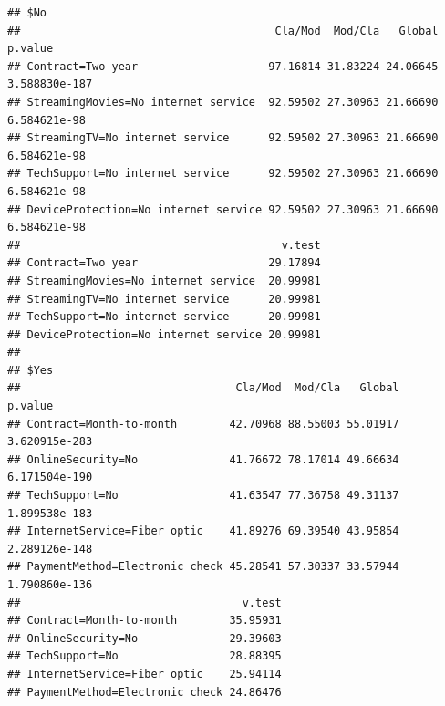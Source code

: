 \documentclass[
  twoside]{article}
\newenvironment{Shaded}{\begin{snugshade}}{\end{snugshade}}
\newcommand{\AttributeTok}[1]{\textcolor[rgb]{0.77,0.63,0.00}{#1}}
\newcommand{\DecValTok}[1]{\textcolor[rgb]{0.00,0.00,0.81}{#1}}
\newcommand{\FunctionTok}[1]{\textcolor[rgb]{0.00,0.00,0.00}{#1}}
\newcommand{\NormalTok}[1]{#1}
\newcommand{\SpecialCharTok}[1]{\textcolor[rgb]{0.00,0.00,0.00}{#1}}
\begin{document}
\begin{verbatim}
## $No
##                                       Cla/Mod  Mod/Cla   Global       p.value
## Contract=Two year                    97.16814 31.83224 24.06645 3.588830e-187
## StreamingMovies=No internet service  92.59502 27.30963 21.66690  6.584621e-98
## StreamingTV=No internet service      92.59502 27.30963 21.66690  6.584621e-98
## TechSupport=No internet service      92.59502 27.30963 21.66690  6.584621e-98
## DeviceProtection=No internet service 92.59502 27.30963 21.66690  6.584621e-98
##                                        v.test
## Contract=Two year                    29.17894
## StreamingMovies=No internet service  20.99981
## StreamingTV=No internet service      20.99981
## TechSupport=No internet service      20.99981
## DeviceProtection=No internet service 20.99981
## 
## $Yes
##                                 Cla/Mod  Mod/Cla   Global       p.value
## Contract=Month-to-month        42.70968 88.55003 55.01917 3.620915e-283
## OnlineSecurity=No              41.76672 78.17014 49.66634 6.171504e-190
## TechSupport=No                 41.63547 77.36758 49.31137 1.899538e-183
## InternetService=Fiber optic    41.89276 69.39540 43.95854 2.289126e-148
## PaymentMethod=Electronic check 45.28541 57.30337 33.57944 1.790860e-136
##                                  v.test
## Contract=Month-to-month        35.95931
## OnlineSecurity=No              29.39603
## TechSupport=No                 28.88395
## InternetService=Fiber optic    25.94114
## PaymentMethod=Electronic check 24.86476
\end{verbatim}

\begin{Shaded}
\end{Shaded}
\end{document}
